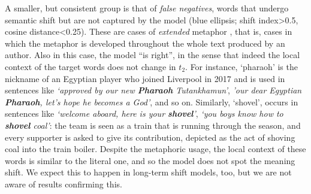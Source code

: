 A smaller, but consistent group is that of \textit{false negatives}, 
words that undergo semantic shift but are not captured by the model
(blue ellipsis; shift index\textgreater 0.5, cosine distance\textless 0.25).
These are cases of \textit{extended}
metaphor \cite{werth1994extended}, that is, cases in which the metaphor is 
developed throughout the whole text produced by an author. Also in this case, the model ``is right'', in the sense that indeed
the local context of the target words does not change in $t_2$.
For instance, `pharaoh' is the nickname of an Egyptian player who
joined Liverpool in 2017 and is used in
sentences like \textit{`approved by our new \textbf{Pharaoh}
  Tutankhamun'}, \textit{'our dear Egyptian \textbf{Pharaoh},
  let's hope he becomes a God'}, and so on. Similarly, `shovel',  occurs in sentences
like \textit{`welcome aboard, here is your \textbf{shovel}'},
\textit{`you boys know how to \textbf{shovel} coal'}: the team is seen as a train that is running through the season, and every supporter is asked to give its contribution, depicted as the act of shoving coal into the train boiler. Despite the metaphoric usage, the local context of these words is similar to the literal one, and so the model does not spot the meaning shift. We expect this to happen in long-term shift models, too, but we are not aware of results confirming this.


